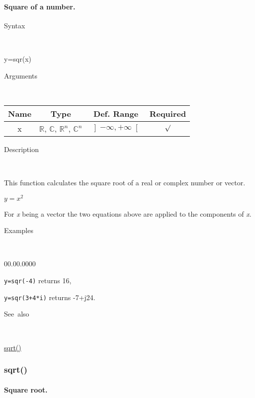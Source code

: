 \paragraph{\label{par:Square}Square of a number.}

\begin{description}
\item [Syntax]~
\end{description}
y=sqr(x)

\begin{description}
\item [Arguments]~
\end{description}
\begin{tabular}{|c|c|c|c|}
\hline 
Name&
Type&
Def. Range&
Required\tabularnewline
\hline
\hline 
x&
$\mathbb{R}$, $\mathbb{C}$, $\mathbb{R}^{n}$, $\mathbb{C}^{n}$&
$\left]-\infty,+\infty\right[$&
$\surd$\tabularnewline
\hline
\end{tabular}

\begin{description}
\item [Description]~
\end{description}
This function calculates the square root of a real or complex number
or vector.

\medskip{}
$y=x^{2}$ 
\medskip{}

For \textit{x} being a vector the two equations above are
applied to the components of \textit{x}.

\begin{description}
\item [Examples]~
\end{description}
\begin{lyxlist}{00.00.0000}
\item [\texttt{y=sqr(-4)}]returns 16,
\item [\texttt{y=sqr(3+4{*}i)}]returns -7+j24.
\end{lyxlist}
\begin{description}
\item [See~also]~
\end{description}
\textcolor{blue}{\hyperlink{sqrt}{sqrt()}}


\newpage
\subsubsection*{\hypertarget{sqrt}{}{\Large sqrt()}}


\paragraph{\label{par:Square-root}Square root.}


